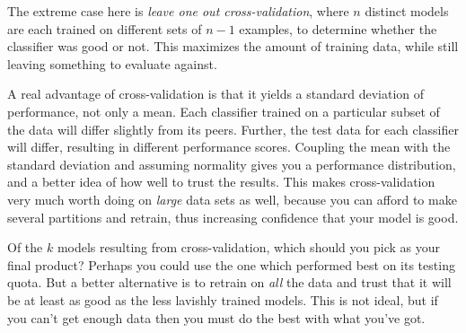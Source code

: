 \documentclass[10pt]{article}
\begin{document}
The extreme case here is \textit{leave one out cross-validation}, where $n$ distinct models are each trained on different sets of $n-1$ examples, to determine whether the classifier was good or not. This maximizes the amount of training data, while still leaving something to evaluate against.

A real advantage of cross-validation is that it yields a standard deviation of performance, not only a mean. Each classifier trained on a particular subset of the data will differ slightly from its peers. Further, the test data for each classifier will differ, resulting in different performance scores. Coupling the mean with the standard deviation and assuming normality gives you a performance distribution, and a better idea of how well to trust the results. This makes cross-validation very much worth doing on \textit{large} data sets as well, because you can afford to make several partitions and retrain, thus increasing confidence that your model is good.

Of the $k$ models resulting from cross-validation, which should you pick as your final product? Perhaps you could use the one which performed best on its testing quota. But a better alternative is to retrain on \textit{all} the data and trust that it will be at least as good as the less lavishly trained models. This is not ideal, but if you can’t get enough data then you must do the best with what you’ve got.
\end{document}
